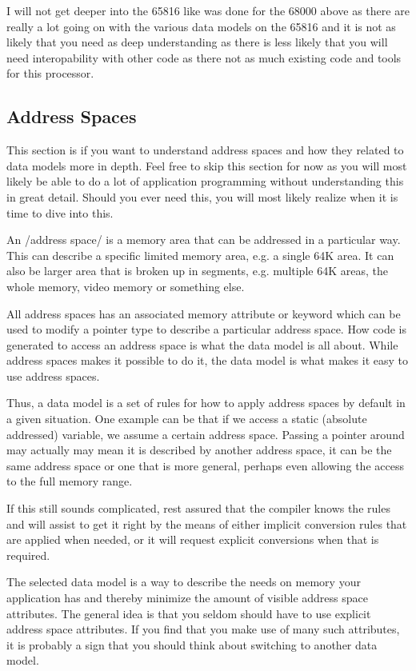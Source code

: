 I will not get deeper into the 65816 like was done for the 68000 above
as there are really a lot going on with the various data models on the
65816 and it is not as likely that you need as deep understanding as
there is less likely that you will need interopability with other code
as there not as much existing code and tools for this processor.

\subsection*{Address Spaces}

This section is if you want to understand address spaces and how they
related to data models more in depth. Feel free to skip this section
for now as you will most likely be able to do a lot of application
programming without understanding this in great detail. Should you
ever need this, you will most likely realize when it is time to dive
into this.

An /address space/ is a memory area that can be addressed in a
particular way. This can describe a specific limited memory area,
e.g. a single 64K area. It can also be larger area that is broken up
in segments, e.g. multiple 64K areas, the whole memory, video memory
or something else.

All address spaces has an associated memory attribute or keyword which
can be used to modify a pointer type to describe a particular address
space. How code is generated to access an address space is what the
data model is all about. While address spaces makes it possible to do
it, the data model is what makes it easy to use address spaces.

Thus, a data model is a set of rules for how to apply address spaces
by default in a given situation. One example can be that if we access
a static (absolute addressed) variable, we assume a certain address
space. Passing a pointer around may actually may mean it is described
by another address space, it can be the same address space or one that
is more general, perhaps even allowing the access to the full memory
range.

If this still sounds complicated, rest assured that the compiler knows
the rules and will assist to get it right by the means of either
implicit conversion rules that are applied when needed, or it will
request explicit conversions when that is required.

The selected data model is a way to describe the needs on memory your
application has and thereby minimize the amount of visible address
space attributes. The general idea is that you seldom should have to use
explicit address space attributes. If you find that you make use of many
such attributes, it is probably a sign that you should think about
switching to another data model.
